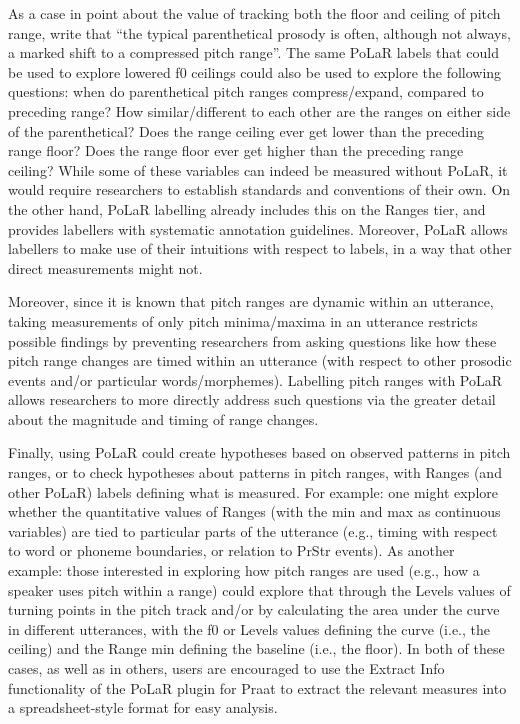 As a case in point about the value of tracking both the floor and ceiling of pitch range, \citet{dehewichmann10} write that “the typical parenthetical prosody is often, although not always, a marked shift to a compressed pitch range”. The same PoLaR labels that could be used to explore lowered f0 ceilings could also be used to explore the following questions: when do parenthetical pitch ranges compress\slash expand, compared to preceding range? How similar\slash different to each other are the ranges on either side of the parenthetical? Does the range ceiling ever get lower than the preceding range floor? Does the range floor ever get higher than the preceding range ceiling? While some of these variables can indeed be measured without PoLaR, it would require researchers to establish standards and conventions of their own. On the other hand, PoLaR labelling already includes this on the Ranges tier, and provides labellers with systematic annotation guidelines. Moreover, PoLaR allows labellers to make use of their intuitions with respect to labels, in a way that other direct measurements might not. 

Moreover, since it is known that pitch ranges are dynamic within an utterance, taking measurements of only pitch minima\slash maxima in an utterance restricts possible findings by preventing researchers from asking questions like how these pitch range changes are timed within an utterance (with respect to other prosodic events and/or particular words\slash morphemes). Labelling pitch ranges with PoLaR allows researchers to more directly address such questions via the greater detail about the magnitude and timing of range changes.  

Finally, using PoLaR could create hypotheses based on observed patterns in pitch ranges, or to check hypotheses about patterns in pitch ranges, with Ranges (and other PoLaR) labels defining what is measured. For example: one might explore whether the quantitative values of Ranges (with the min and max as continuous variables) are tied to particular parts of the utterance (e.g., timing with respect to word or phoneme boundaries, or relation to PrStr events). As another example: those interested in exploring how pitch ranges are used (e.g., how a speaker uses pitch within a range) could explore that through the Levels values of turning points in the pitch track and/or by calculating the area under the curve in different utterances, with the f0 or Levels values defining the curve (i.e., the ceiling) and the Range min defining the baseline (i.e., the floor). In both of these cases, as well as in others, users are encouraged to use the Extract Info functionality of the PoLaR plugin for Praat to extract the relevant measures into a spreadsheet-style format for easy analysis.

